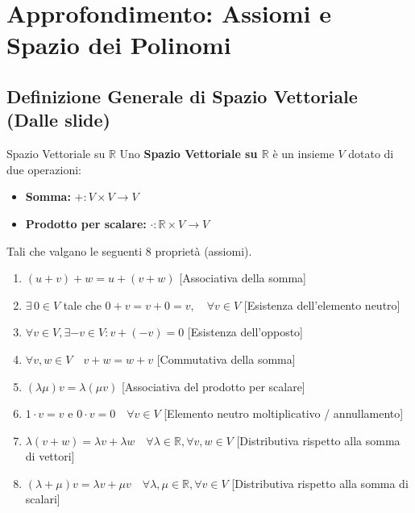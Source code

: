 
\section{Approfondimento: Assiomi e Spazio dei Polinomi}

\subsection{Definizione Generale di Spazio Vettoriale (Dalle slide)}

\begin{definition}{Spazio Vettoriale su $\mathbb{R}$}{}
Uno \textbf{Spazio Vettoriale su $\mathbb{R}$} è un insieme $V$ dotato di due operazioni:
\begin{itemize}
    \item \textbf{Somma:} $+ : V \times V \to V$
    \item \textbf{Prodotto per scalare:} $\cdot : \mathbb{R} \times V \to V$
\end{itemize}
Tali che valgano le seguenti 8 proprietà (assiomi).
\end{definition}

\begin{enumerate}
    \item $(u + v) + w = u + (v + w)$ [Associativa della somma]
    \item $\exists \, 0 \in V$ tale che $0 + v = v + 0 = v, \quad \forall v \in V$ [Esistenza dell'elemento neutro]
    \item $\forall v \in V, \exists -v \in V : v + (-v) = 0$ [Esistenza dell'opposto]
    \item $\forall v, w \in V \quad v + w = w + v$ [Commutativa della somma]
    \item $(\lambda \mu) v = \lambda (\mu v)$ [Associativa del prodotto per scalare]
    \item $1 \cdot v = v$ e $0 \cdot v = 0 \quad \forall v \in V$ [Elemento neutro moltiplicativo / annullamento]
    \item $\lambda (v + w) = \lambda v + \lambda w \quad \forall \lambda \in \mathbb{R}, \forall v, w \in V$ [Distributiva rispetto alla somma di vettori]
    \item $(\lambda + \mu) v = \lambda v + \mu v \quad \forall \lambda, \mu \in \mathbb{R}, \forall v \in V$ [Distributiva rispetto alla somma di scalari]
\end{enumerate}

